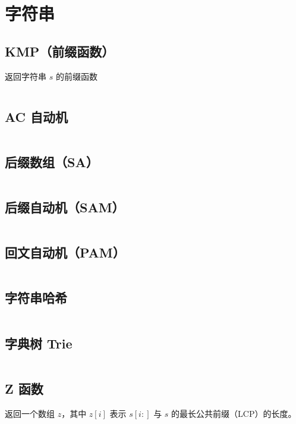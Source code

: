 \documentclass[a4paper, twoside]{article}
\begin{document}
\newpage
\section{字符串}
\subsection{KMP（前缀函数）}
返回字符串 $s$ 的前缀函数
\inputminted{cpp}{../src/字符串/KMP（前缀函数）.cpp}

\subsection{AC 自动机}
\inputminted{cpp}{../src/字符串/AC自动机.cpp}

\subsection{后缀数组（SA）}
\inputminted{cpp}{../src/字符串/后缀数组（SA）.cpp}

\subsection{后缀自动机（SAM）}
\inputminted{cpp}{../src/字符串/后缀自动机（SAM）.cpp}

\subsection{回文自动机（PAM）}
\inputminted{cpp}{../src/字符串/回文自动机（PAM）.cpp}

\subsection{字符串哈希}
\inputminted{cpp}{../src/字符串/字符串哈希.cpp}


\subsection{字典树 Trie}
\inputminted{cpp}{../src/字符串/字典树Trie.cpp}

\subsection{Z 函数}
返回一个数组 $z$，其中 $z[i]$ 表示 $s[i:]$ 与 $s$ 的最长公共前缀（LCP）的长度。
\inputminted{cpp}{../src/字符串/Z函数.cpp}
\end{document}
